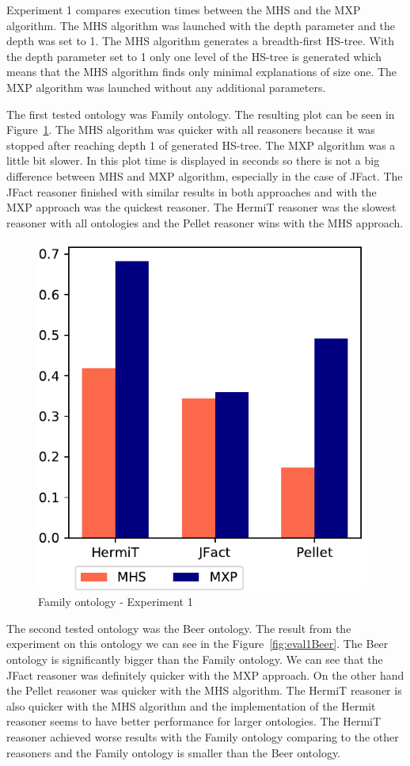 \documentclass[12pt,a4paper]{article}
\begin{document}
Experiment 1 compares execution times between the MHS and the MXP algorithm. The MHS algorithm was launched with the depth parameter and the depth was set to 1. The MHS algorithm generates a breadth-first HS-tree. With the depth parameter set to 1 only one level of the HS-tree is generated which means that the MHS algorithm finds only minimal explanations of size one. The MXP algorithm was launched without any additional parameters.

The first tested ontology was Family ontology. The resulting plot can be seen in Figure~\ref{fig:eval1Family}. The MHS algorithm was quicker with all reasoners because it was stopped after reaching depth 1 of generated HS-tree. The MXP algorithm was a little bit slower. In this plot time is displayed in seconds so there is not a big difference between MHS and MXP algorithm, especially in the case of JFact. The JFact reasoner finished with similar results in both approaches and with the MXP approach was the quickest reasoner. The HermiT reasoner was the slowest reasoner with all ontologies and the Pellet reasoner wins with the MHS approach.

\begin{figure}[H]
	\centering
	\includegraphics[width=11cm]{eval1Family}
	\caption{Family ontology - Experiment 1}
	\label{fig:eval1Family}
\end{figure}

The second tested ontology was the Beer ontology. The result from the experiment on this ontology we can see in the Figure~\ref{fig:eval1Beer}. The Beer ontology is significantly bigger than the Family ontology. We can see that the JFact reasoner was definitely quicker with the MXP approach. On the other hand the Pellet reasoner was quicker with the MHS algorithm. The HermiT reasoner is also quicker with the MHS algorithm and the implementation of the Hermit reasoner seems to have better performance for larger ontologies. The HermiT reasoner achieved worse results with the Family ontology comparing to the other reasoners and the Family ontology is smaller than the Beer ontology.
\end{document}
